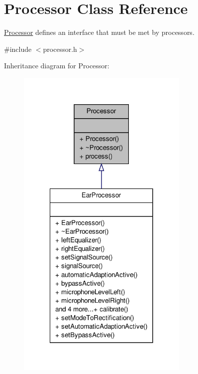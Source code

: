 \hypertarget{classProcessor}{\section{\-Processor \-Class \-Reference}
\label{db/d9f/classProcessor}
}


\hyperlink{classProcessor}{\-Processor} defines an interface that must be met by processors.  




{\ttfamily \#include $<$processor.\-h$>$}



\-Inheritance diagram for \-Processor\-:
\nopagebreak
\begin{figure}[H]
\begin{center}
\leavevmode
\includegraphics[width=234pt]{dd/d93/classProcessor__inherit__graph}
\end{center}
\end{figure}
